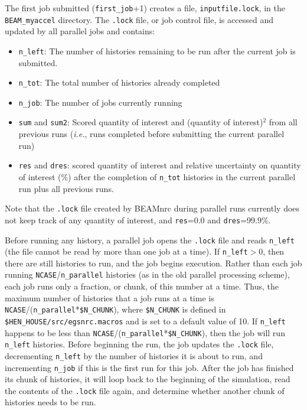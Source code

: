 \documentclass[12pt,twoside]{article}
\begin{document}
The first job submitted ({\tt first\_job}+1) creates
a file, {\tt inputfile.lock}, in the {\tt BEAM\_myaccel} directory.  The
{\tt .lock} file, or job control file, is accessed and updated by all parallel
jobs and contains:
\begin{itemize}
\item {\tt n\_left}: The number of histories remaining to be run after the current
job is submitted.
\item {\tt n\_tot}: The total number of histories already completed
\item {\tt n\_job}: The number of jobs currently running
\item {\tt sum} and {\tt sum2}: Scored quantity of interest and (quantity of
interest)$^2$ from all previous runs ({\em i.e.}, runs completed before
submitting the current parallel run) \item {\tt res} and {\tt dres}: scored
quantity of interest and relative uncertainty on quantity of interest (\%) after
the completion of {\tt n\_tot} histories in the current parallel run plus all
previous runs.
\end{itemize}

Note that the {\tt .lock} file created by BEAMnrc during parallel runs currently
does not keep track of any quantity of interest, and
{\tt res}=0.0 and {\tt dres}=99.9\%.

Before running any history, a parallel job opens the {\tt .lock} file and
reads {\tt n\_left} (the file cannot be read by more than one job at
a time).  If {\tt n\_left}$>$0, then there are still histories
to run, and the job begins execution.
Rather than each job running {\tt NCASE}/{\tt n\_parallel}
histories (as in the old parallel processing scheme), each job runs only
a fraction, or chunk, of this number at a time.  Thus, the maximum number
of histories that a job runs at a time is
{\tt NCASE}/({\tt n\_parallel}*{\tt \$N\_CHUNK}), where {\tt \$N\_CHUNK}
is defined in {\tt \$HEN\_HOUSE/src/egsnrc.macros} and is set to a default
value of 10.  If {\tt n\_left} happens to be less than
{\tt NCASE}/({\tt n\_parallel}*{\tt \$N\_CHUNK}),
then the job will run {\tt n\_left} histories.  Before beginning the
run, the job updates the {\tt .lock} file, decrementing
{\tt n\_left} by the number of histories it is about to run, and
incrementing {\tt n\_job} if this is the first run for this job.
After the job has finished its chunk of histories, it will loop
back to the beginning of the simulation, read the contents of the
{\tt .lock} file again, and determine whether another
chunk of histories needs to be run.
\end{document}
